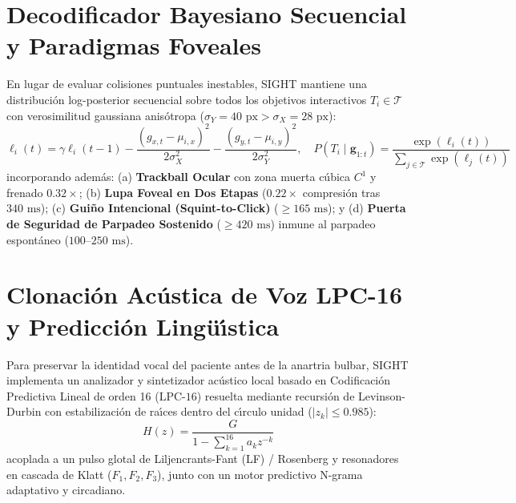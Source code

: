 \documentclass[twocolumn,10pt]{article}
\begin{document}
\section{Decodificador Bayesiano Secuencial y Paradigmas Foveales}
\label{sec:bayesian}
En lugar de evaluar colisiones puntuales inestables, SIGHT mantiene una distribuci\'on log-posterior secuencial sobre todos los objetivos interactivos $T_i \in \mathcal{T}$ con verosimilitud gaussiana anis\'otropa ($\sigma_Y = 40\text{ px} > \sigma_X = 28\text{ px}$):
\begin{equation}
\ell_i(t) = \gamma \ell_i(t-1) - \frac{(g_{x,t} - \mu_{i,x})^2}{2\sigma_X^2} - \frac{(g_{y,t} - \mu_{i,y})^2}{2\sigma_Y^2}, \quad P(T_i \mid \mathbf{g}_{1:t}) = \frac{\exp(\ell_i(t))}{\sum_{j \in \mathcal{T}} \exp(\ell_j(t))}
\end{equation}
incorporando adem\'as: (a) \textbf{Trackball Ocular} con zona muerta c\'ubica $C^1$ y frenado $0.32\times$; (b) \textbf{Lupa Foveal en Dos Etapas} ($0.22\times$ compresi\'on tras $340\text{ ms}$); (c) \textbf{Gui\~no Intencional (Squint-to-Click)} ($\ge 165\text{ ms}$); y (d) \textbf{Puerta de Seguridad de Parpadeo Sostenido} ($\ge 420\text{ ms}$) inmune al parpadeo espont\'aneo ($100\text{--}250\text{ ms}$).

\section{Clonaci\'on Ac\'ustica de Voz LPC-16 y Predicci\'on Ling\"u\'{\i}stica}
\label{sec:voice}
Para preservar la identidad vocal del paciente antes de la anartria bulbar, SIGHT implementa un analizador y sintetizador ac\'ustico local basado en Codificaci\'on Predictiva Lineal de orden 16 ($\text{LPC-16}$) resuelta mediante recursi\'on de Levinson-Durbin con estabilizaci\'on de ra\'{\i}ces dentro del c\'{\i}rculo unidad ($|z_k| \le 0.985$):
\begin{equation}
H(z) = \frac{G}{1 - \sum_{k=1}^{16} a_k z^{-k}}
\end{equation}
acoplada a un pulso glotal de Liljencrants-Fant (LF) / Rosenberg y resonadores en cascada de Klatt ($F_1, F_2, F_3$), junto con un motor predictivo N-grama adaptativo y circadiano.
\end{document}
